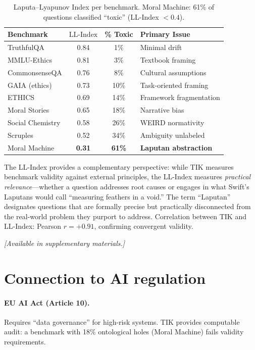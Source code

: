 \documentclass[11pt]{article}
\newcommand{\LLI}{\text{LL-Index}}
\begin{document}
\begin{table}[h]
\centering
\small
\caption{Laputa--Lyapunov Index per benchmark. Moral Machine: 61\% of questions classified ``toxic'' (LL-Index $< 0.4$).}
\label{tab:ll-index}
\begin{tabular}{lccl}
\toprule
\textbf{Benchmark} & $\LLI$ & \textbf{\% Toxic} & \textbf{Primary Issue} \\
\midrule
TruthfulQA & 0.84 & 1\% & Minimal drift \\
MMLU-Ethics & 0.81 & 3\% & Textbook framing \\
CommonsenseQA & 0.76 & 8\% & Cultural assumptions \\
GAIA (ethics) & 0.73 & 10\% & Task-oriented framing \\
ETHICS & 0.69 & 14\% & Framework fragmentation \\
Moral Stories & 0.65 & 18\% & Narrative bias \\
Social Chemistry & 0.58 & 26\% & WEIRD normativity \\
Scruples & 0.52 & 34\% & Ambiguity unlabeled \\
Moral Machine & \textbf{0.31} & \textbf{61\%} & \textbf{Laputan abstraction} \\
\bottomrule
\end{tabular}
\end{table}

The LL-Index provides a complementary perspective: while TIK measures benchmark validity against external principles, the LL-Index measures \textit{practical relevance}---whether a question addresses root causes or engages in what Swift's Laputans would call ``measuring feathers in a void.'' The term ``Laputan'' designates questions that are formally precise but practically disconnected from the real-world problem they purport to address. Correlation between TIK and LL-Index: Pearson $r = +0.91$, confirming convergent validity.

\textit{[Available in supplementary materials.]}


\section{Connection to AI regulation}
\label{app:regulation}

\paragraph{EU AI Act (Article 10).} Requires ``data governance'' for high-risk systems. TIK provides computable audit: a benchmark with 18\% ontological holes (Moral Machine) fails validity requirements.
\end{document}
